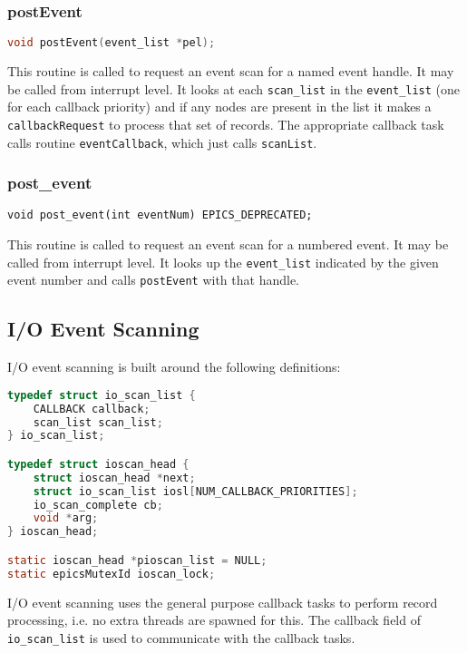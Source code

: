 \subsubsection{postEvent}

\begin{lstlisting}[language=C]
void postEvent(event_list *pel);
\end{lstlisting}

This routine is called to request an event scan for a named event handle.
It may be called from interrupt level.
It looks at each \verb|scan_list| in the \verb|event_list| (one for each callback priority) and if any nodes are present in the list it makes a \verb|callbackRequest| to process that set of records.
The appropriate callback task calls routine \verb|eventCallback|, which just calls \verb|scanList|.

\subsubsection{post\_event}

\begin{verbatim}
void post_event(int eventNum) EPICS_DEPRECATED;
\end{verbatim}

This routine is called to request an event scan for a numbered event.
It may be called from interrupt level.
It looks up the \verb|event_list| indicated by the given event number and calls \verb|postEvent| with that handle.

\subsection{I/O Event Scanning}

I/O event scanning is built around the following definitions:

\begin{lstlisting}[language=C]
typedef struct io_scan_list {
    CALLBACK callback;
    scan_list scan_list;
} io_scan_list;

typedef struct ioscan_head {
    struct ioscan_head *next;
    struct io_scan_list iosl[NUM_CALLBACK_PRIORITIES];
    io_scan_complete cb;
    void *arg;
} ioscan_head;

static ioscan_head *pioscan_list = NULL;
static epicsMutexId ioscan_lock;
\end{lstlisting}

I/O event scanning uses the general purpose callback tasks to perform record processing, i.e. no extra threads are spawned for this.
The callback field of \verb|io_scan_list| is used to communicate with the callback tasks.

